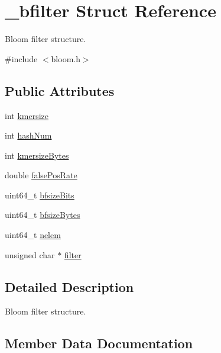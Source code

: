 \hypertarget{struct__bfilter}{}\section{\+\_\+bfilter Struct Reference}
\label{struct__bfilter}


Bloom filter structure.  




{\ttfamily \#include $<$bloom.\+h$>$}

\subsection*{Public Attributes}
\begin{DoxyCompactItemize}
\item 
int \mbox{\hyperlink{struct__bfilter_aaccbef9fad8a88369249ff0638b2a032}{kmersize}}
\item 
int \mbox{\hyperlink{struct__bfilter_ab1c41e821137ae9d35a240c67819d51f}{hash\+Num}}
\item 
int \mbox{\hyperlink{struct__bfilter_aa7612223f56f3bb6cb40d96645bc982e}{kmersize\+Bytes}}
\item 
double \mbox{\hyperlink{struct__bfilter_a7a87113cbc7834ff20dd1f40cd06973c}{false\+Pos\+Rate}}
\item 
uint64\+\_\+t \mbox{\hyperlink{struct__bfilter_adb5c576f93d920a3ad5250781698d6ff}{bfsize\+Bits}}
\item 
uint64\+\_\+t \mbox{\hyperlink{struct__bfilter_a61487a85ddb47e6642f8c805f4d2f041}{bfsize\+Bytes}}
\item 
uint64\+\_\+t \mbox{\hyperlink{struct__bfilter_afdabad504407bfdee536cf67c66303c4}{nelem}}
\item 
unsigned char $\ast$ \mbox{\hyperlink{struct__bfilter_a259a669cdf8b5a8da27e8346c1edea32}{filter}}
\end{DoxyCompactItemize}


\subsection{Detailed Description}
Bloom filter structure. 

\subsection{Member Data Documentation}
\mbox{\label{struct__bfilter_adb5c576f93d920a3ad5250781698d6ff}} 
